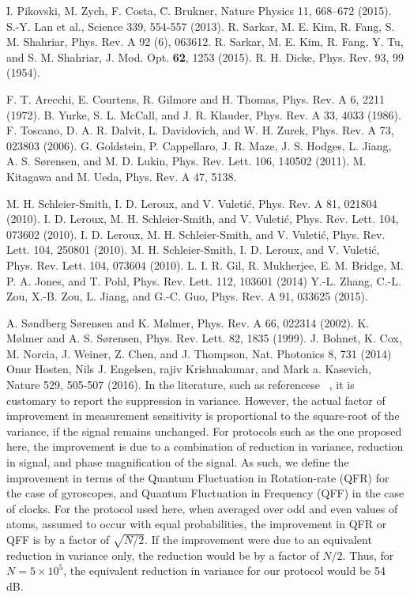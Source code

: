 \documentclass[aps,pra,letterpaper,superscriptaddress,showpacs,amsmath,floats,twocolumn]{revtex4-1}
\begin{document}
{{{{{\begin{thebibliography}{100}
 I. Pikovski, M. Zych, F. Costa, \u{C}. Brukner, Nature Physics 11, 668–672 (2015).
 S.-Y. Lan et al., Science 339, 554-557 (2013).
 R. Sarkar, M. E. Kim, R. Fang, S. M. Shahriar, Phys. Rev. A 92 (6), 063612.
 R. Sarkar, M. E. Kim, R. Fang, Y. Tu, and S. M. Shahriar, J. Mod. Opt. {\bf 62}, 1253 (2015).
 R. H. Dicke, Phys. Rev. 93, 99 (1954).

 F. T. Arecchi, E. Courtens, R. Gilmore and H. Thomas, Phys. Rev. A 6, 2211 (1972).
 B. Yurke, S. L. McCall, and J. R. Klauder, Phys. Rev. A 33, 4033 (1986).
 F. Toscano, D. A. R. Dalvit, L. Davidovich, and W. H. Zurek, Phys. Rev. A 73, 023803 (2006).
 G. Goldstein, P. Cappellaro, J. R. Maze, J. S. Hodges, L. Jiang, A. S. S{\o}rensen, and M. D. Lukin, Phys. Rev. Lett. 106, 140502 (2011).
 M. Kitagawa and M. Ueda, Phys. Rev. A 47, 5138.

 M. H. Schleier-Smith, I. D. Leroux, and V. Vuleti\'c, Phys. Rev. A 81, 021804 (2010).
 I. D. Leroux, M. H. Schleier-Smith, and V. Vuleti\'c, Phys. Rev. Lett. 104, 073602 (2010).
 I. D. Leroux, M. H. Schleier-Smith, and V. Vuleti\'c, Phys. Rev. Lett. 104, 250801 (2010).
  M. H. Schleier-Smith, I. D. Leroux, and V. Vuleti\'c, Phys. Rev. Lett. 104, 073604 (2010).
 L. I. R. Gil, R. Mukherjee, E. M. Bridge, M. P. A. Jones, and T. Pohl, Phys. Rev. Lett. 112, 103601 (2014)
 Y.-L. Zhang, C.-L. Zou, X.-B. Zou, L. Jiang, and G.-C. Guo, Phys. Rev. A 91, 033625 (2015).

 A. S{\o}ndberg S{\o}rensen and K. Mølmer, Phys. Rev. A 66, 022314 (2002).
 K. M{\o}lmer and A. S. S{\o}rensen, Phys. Rev. Lett. 82, 1835 (1999).
 J. Bohnet, K. Cox, M. Norcia, J. Weiner, Z. Chen, and J. Thompson, Nat. Photonics 8, 731 (2014)
 Onur Hosten, Nils J. Engelsen, rajiv Krishnakumar, and Mark a. Kasevich, Nature 529, 505-507 (2016).
 In the literature, such as referencese ~\cite{Leroux1,Monika,Thompson,Hosten}, it is customary to report the suppression in variance. However, the actual factor of improvement in measurement sensitivity is proportional to the square-root of the variance, if the signal remains unchanged. For protocols such as the one proposed here, the improvement is due to a combination of reduction in variance, reduction in signal, and phase magnification of the signal. As such, we define the improvement in terms of the Quantum Fluctuation in Rotation-rate (QFR) for the case of gyroscopes, and Quantum Fluctuation in Frequency (QFF) in the case of clocks. For the protocol used here, when averaged over odd and even values of atoms, assumed to occur with equal probabilities, the improvement in QFR or QFF is by a factor of $\sqrt{N/2}$. If the improvement were due to an equivalent reduction in variance only, the reduction would be by a factor of ${N/2}$. Thus, for $N=5 \times 10^{5}$, the equivalent reduction in variance for our protocol would be 54 dB.


\end{thebibliography}}}}}}
\end{document}

